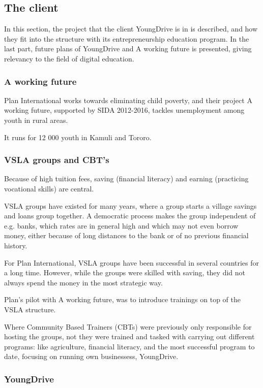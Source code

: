 \subsection{The client}

In this section, the project that the client YoungDrive is in is described, and how they fit into the structure with its entrepreneurship education program. In the last part, future plans of YoungDrive and A working future is presented, giving relevancy to the field of digital education.

\subsubsection{A working future}

Plan International works towards eliminating child poverty, and their project A working future, supported by SIDA 2012-2016, tackles unemployment among youth in rural areas.

It runs for 12 000 youth in Kamuli and Tororo.

\subsubsection{VSLA groups and CBT's}

Because of high tuition fees, saving (financial literacy) and earning (practicing vocational skills) are central.

VSLA groups have existed for many years, where a group starts a village savings and loans group together. A democratic process makes the group independent of e.g. banks, which rates are in general high and which may not even borrow money, either because of long distances to the bank or of no previous financial history.

For Plan International, VSLA groups have been successful in several countries for a long time. However, while the groups were skilled with saving, they did not always spend the money in the most strategic way.

Plan's pilot with A working future, was to introduce trainings on top of the VSLA structure.

Where Community Based Trainers (CBTs) were previously only responsible for hosting the groups, not they were trained and tasked with carrying out different programs: like agriculture, financial literacy, and the most successful program to date, focusing on running own businessess, YoungDrive.

\subsubsection{YoungDrive}

